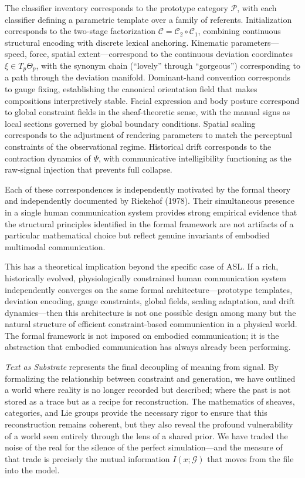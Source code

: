 \documentclass[11pt,a4paper]{article}
\theoremstyle{definition}
\theoremstyle{remark}
\begin{document}
The classifier inventory corresponds to the prototype category $\mathcal{P}$, with each classifier defining a parametric template over a family of referents. Initialization corresponds to the two-stage factorization $\mathcal{C} = \mathcal{C}_2 \circ \mathcal{C}_1$, combining continuous structural encoding with discrete lexical anchoring. Kinematic parameters---speed, force, spatial extent---correspond to the continuous deviation coordinates $\xi \in T_p\Theta_p$, with the synonym chain (``lovely'' through ``gorgeous'') corresponding to a path through the deviation manifold. Dominant-hand convention corresponds to gauge fixing, establishing the canonical orientation field that makes compositions interpretively stable. Facial expression and body posture correspond to global constraint fields in the sheaf-theoretic sense, with the manual signs as local sections governed by global boundary conditions. Spatial scaling corresponds to the adjustment of rendering parameters to match the perceptual constraints of the observational regime. Historical drift corresponds to the contraction dynamics of $\Psi$, with communicative intelligibility functioning as the raw-signal injection that prevents full collapse.

Each of these correspondences is independently motivated by the formal theory and independently documented by Riekehof (1978). Their simultaneous presence in a single human communication system provides strong empirical evidence that the structural principles identified in the formal framework are not artifacts of a particular mathematical choice but reflect genuine invariants of embodied multimodal communication.

This has a theoretical implication beyond the specific case of ASL. If a rich, historically evolved, physiologically constrained human communication system independently converges on the same formal architecture---prototype templates, deviation encoding, gauge constraints, global fields, scaling adaptation, and drift dynamics---then this architecture is not one possible design among many but the natural structure of efficient constraint-based communication in a physical world. The formal framework is not imposed on embodied communication; it is the abstraction that embodied communication has always already been performing.

\emph{Text as Substrate} represents the final decoupling of meaning from signal. By formalizing the relationship between constraint and generation, we have outlined a world where reality is no longer recorded but described; where the past is not stored as a trace but as a recipe for reconstruction. The mathematics of sheaves, categories, and Lie groups provide the necessary rigor to ensure that this reconstruction remains coherent, but they also reveal the profound vulnerability of a world seen entirely through the lens of a shared prior. We have traded the noise of the real for the silence of the perfect simulation---and the measure of that trade is precisely the mutual information $I(x; \mathcal{G})$ that moves from the file into the model.
\end{document}
